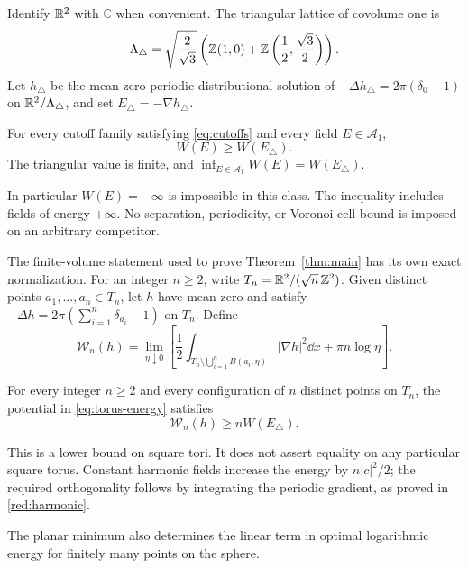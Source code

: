 Identify $\mathbb R^2$ with $\mathbb C$ when convenient. The triangular lattice
of covolume one is
\begin{equation}\label{eq:triangular-lattice}
\Lambda_\triangle
=\sqrt{\frac{2}{\sqrt3}}
 \left(\mathbb Z(1,0)+\mathbb Z\left(\frac12,\frac{\sqrt3}{2}\right)\right).
\end{equation}
Let $h_\triangle$ be the mean-zero periodic distributional solution of
$-\Delta h_\triangle=2\pi(\delta_0-1)$ on
$\mathbb R^2/\Lambda_\triangle$, and set $E_\triangle=-\nabla h_\triangle$.

\begin{theorem}\label{thm:main}
For every cutoff family satisfying \eqref{eq:cutoffs} and every field
$E\in\mathcal A_1$,
\[
W(E)\geq W(E_\triangle).
\]
The triangular value is finite, and
$\inf_{E\in\mathcal A_1}W(E)=W(E_\triangle)$.
\end{theorem}

In particular $W(E)=-\infty$ is impossible in this class. The inequality
includes fields of energy $+\infty$. No separation, periodicity, or
Voronoi-cell bound is imposed on an arbitrary competitor.

The finite-volume statement used to prove Theorem~\ref{thm:main} has its
own exact normalization. For an integer $n\geq2$, write
$T_n=\mathbb R^2/(\sqrt n\,\mathbb Z^2)$. Given distinct points
$a_1,\ldots,a_n\in T_n$, let $h$ have mean zero and satisfy
$-\Delta h=2\pi(\sum_{i=1}^n\delta_{a_i}-1)$ on $T_n$. Define
\begin{equation}\label{eq:torus-energy}
\mathcal W_n(h)=\lim_{\eta\downarrow0}
\left[\frac12\int_{T_n\setminus\bigcup_{i=1}^n B(a_i,\eta)}
 |\nabla h|^2\dd x+\pi n\log\eta\right].
\end{equation}

\begin{theorem}\label{thm:torus}
For every integer $n\geq2$ and every configuration of $n$ distinct points
on $T_n$, the potential in \eqref{eq:torus-energy} satisfies
\[
\mathcal W_n(h)\geq nW(E_\triangle).
\]
\end{theorem}

This is a lower bound on square tori. It does not assert equality on any
particular square torus. Constant harmonic fields increase the energy by
$n|c|^2/2$; the required orthogonality follows by integrating the periodic
gradient, as proved in \eqref{red:harmonic}.

The planar minimum also determines the linear term in optimal
logarithmic energy for finitely many points on the sphere.

